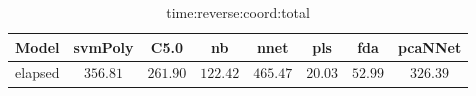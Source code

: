 \begin{table}[!ht]
	\centering
	\begin{tabular}{|c|c|c|c|c|c|c|c|}
		\hline
		Model & svmPoly & C5.0 & nb & nnet & pls & fda & pcaNNet \\ \hline
		elapsed & $356.81$ & $261.90$ & $122.42$ & $465.47$ & $20.03$ & $52.99$ & $326.39$ \\ \hline
	\end{tabular}
	\caption{time:reverse:coord:total}
	\label{tab:time:reverse:coord:total}
\end{table}
